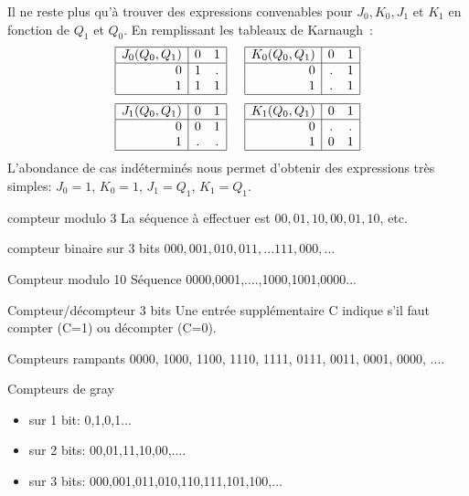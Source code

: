 Il ne reste plus qu'\`a trouver des expressions convenables pour 
$J_0,K_0,J_1$ et $K_1$ en fonction de $Q_1$ et $Q_0$. En remplissant 
les tableaux de Karnaugh~:
{ \small
$$ 
\begin{array}{|r|cc|}
\hline
J_0(Q_0,Q_1) & 0 & 1 \\
\hline
0 & 1 & . \\
1 & 1 & 1 \\
\hline
\end{array}
\hspace{0.5cm}
\begin{array}{|r|cc|}
\hline
K_0(Q_0,Q_1) & 0 & 1 \\
\hline
0 & . & 1 \\
1 & . & 1 \\
\hline
\end{array}
$$
$$
\begin{array}{|r|cc|}
\hline
J_1(Q_0,Q_1) & 0 & 1 \\
\hline
0 & 0 & 1 \\
1 & . & . \\
\hline
\end{array}
\hspace{0.5cm}
\begin{array}{|r|cc|}
\hline
K_1(Q_0,Q_1) & 0 & 1 \\
\hline
0 & . & . \\
1 & 0 & 1 \\
\hline
\end{array}
$$}
L'abondance de cas  ind\'etermin\'es nous permet 
d'obtenir des expressions tr\`es simples:
$J_0 = 1$,		
$K_0 = 1$,
$J_1= Q_1$,
$K_1= Q_1$.


\begin{exercice}{compteur modulo 3} 
La s\'equence \`a effectuer est $00,01,10,00,01,10$, etc.
\end{exercice}

\begin{exercice}{compteur binaire sur 3 bits}
$000, 001, 010, 011, ... 111,000,...$
\end{exercice}

\begin{exercice}{Compteur modulo 10} 
S\'equence 0000,0001,....,1000,1001,0000...
\end{exercice}

\begin{exercice}{Compteur/d\'ecompteur 3 bits} 
Une entr\'ee suppl\'ementaire C
indique s'il faut compter (C=1) ou d\'ecompter (C=0).
\end{exercice}

\begin{exercice}{Compteurs rampants}
	0000, 1000, 1100, 1110, 1111, 0111, 0011, 0001, 0000, ....
\end{exercice}

\begin{exercice}{Compteurs de gray}
\begin{itemize}
\item sur 1 bit:	0,1,0,1...
\item sur 2 bits:	00,01,11,10,00,....
\item sur 3 bits:	000,001,011,010,110,111,101,100,...
\end{itemize}
\end{exercice}


